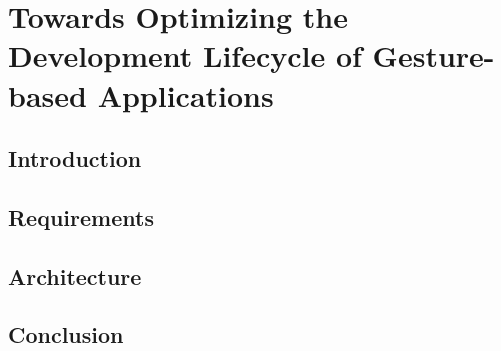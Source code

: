 
\chapter{Towards Optimizing the Development Lifecycle of Gesture-based Applications}\label{chap:zerog}

\section{Introduction}


\section{Requirements}


\section{Architecture}


\section{Conclusion}






